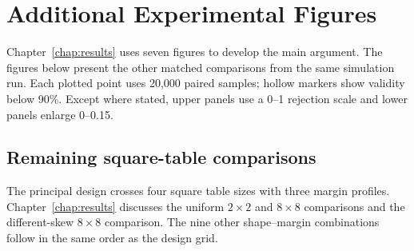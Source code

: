 \chapter{Additional Experimental Figures}
\label{app:additional-results}

Chapter~\ref{chap:results} uses seven figures to develop the main argument.
The figures below present the other matched comparisons from the same
simulation run. Each plotted point uses 20,000 paired
samples; hollow markers show validity below 90\%. Except where stated,
upper panels use a 0--1 rejection scale and lower panels enlarge 0--0.15.

\section{Remaining square-table comparisons}

The principal design crosses four square table sizes with three margin
profiles. Chapter~\ref{chap:results} discusses the uniform \(2\times2\)
and \(8\times8\) comparisons and the different-skew \(8\times8\)
comparison. The nine other shape--margin combinations follow in the
same order as the design grid.

